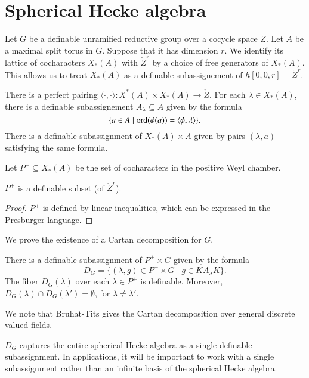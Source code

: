 \section{Spherical Hecke algebra}

Let $G$ be a definable unramified reductive group over a cocycle space $Z$.  Let $A$ be a maximal split torus in $G$.  Suppose that
it has dimension $r$.  We identify its lattice of cocharacters $X_*(A)$ with $\ring{Z}^r$ by a choice of free generators of $X_*(A)$.
This allows us to treat $X_*(A)$ as a definable subassignement of $h[0,0,r] = \ring{Z}^r$.

There is a perfect pairing $\langle \cdot,\cdot\rangle:X^*(A)\times X_*(A) \to \ring{Z}$.
For each $\lambda\in X_*(A)$, there is a definable subassignement $A_\lambda \subseteq A$ given by the formula
\[
\{ a \in A \mid {\operatorname{ord}}(\phi(a)) = \langle \phi,\lambda \rangle \}.
\]
There is a definable subassignment of $X_*(A)\times A$
given by pairs $(\lambda,a)$ satisfying the same formula.

Let $P^+\subseteq X_*(A)$ be the set of cocharacters in the positive Weyl chamber.

\begin{lemma} $P^+$ is a definable subset (of $\ring{Z}^r$).
\end{lemma}

\begin{proof} $P^+$ is defined by linear inequalities, which can be expressed in the Presburger language.
\end{proof}

We prove the existence of a Cartan decomposition for $G$.

\begin{lemma} There is a definable subassignment of $P^+\times G$ given by the formula
\[
D_G = \{(\lambda,g)\in P^+\times G \mid g \in K A_\lambda K \}.
\]
The fiber $D_G(\lambda)$ over each $\lambda\in P^+$ is definable.  Moreover,
$D_G(\lambda)\cap D_G(\lambda') = \emptyset$, for $\lambda\ne \lambda'$.
\end{lemma}


We note that Bruhat-Tits gives the Cartan decomposition over general discrete valued fields.

\begin{remark}   $D_G$ captures the entire spherical Hecke algebra as a single
definable subassignment.  In applications, it will be important to work with a single subassignment
rather than an infinite basis of the spherical Hecke algebra.
\end{remark}

